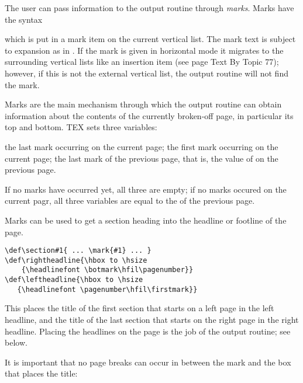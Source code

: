 \begin{multicols}{2}
The user can pass information to the output routine through \textit{marks}. Marks have the syntax

\begin{teX}
\end{teX}

which is put in a mark item on the current vertical list. The mark text is subject to expansion
as in .
If the mark is given in horizontal mode it migrates to the surrounding vertical lists like an
insertion item (see page Text By Topic 77); however, if this is not the external vertical list, the output routine
will not find the mark.

Marks are the main mechanism through which the output routine can obtain information
about the contents of the currently broken-off page, in particular its top and bottom. TEX sets
three variables:

{\obeylines
{} the last mark occurring on the current page;
 the first mark occurring on the current page;
 the last mark of the previous page, that is, the value of  on the previous
page.
}



If no marks have occurred yet, all three are empty; if no marks occured on the current pagr, all three variables are equal to the  of the previous page. 

Marks can be used to get a section heading into the headline or footline of the page.

\begin{verbatim}
\def\section#1{ ... \mark{#1} ... }
\def\rightheadline{\hbox to \hsize
    {\headlinefont \botmark\hfil\pagenumber}}
\def\leftheadline{\hbox to \hsize
   {\headlinefont \pagenumber\hfil\firstmark}}
\end{verbatim}

This places the title of the first section that starts on a left page in the left
headline, and the title of the last section that starts on the right page in
the right headline. Placing the headlines on the page is the job of the output
routine; see below.

It is important that no page breaks can occur in between the mark and the
box that places the title:

\begin{teXXX}
\def\section#1{ ...
   \penalty\beforesectionpenalty
   \mark{#1}
   \hbox{ ... #1 ...}
   \nobreak
   \vskip\aftersectionskip
   \noindent}
\end{teXXX}
\end{multicols}



